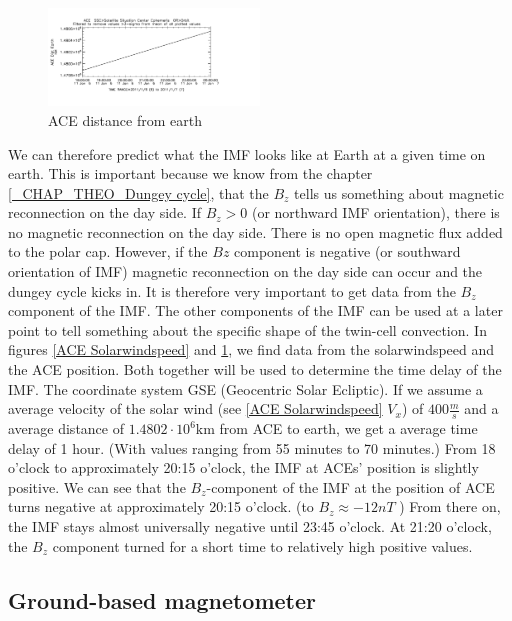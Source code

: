 \documentclass[10pt,a4paper]{article}
\begin{document}
\begin{figure}[h]
\centering
\includegraphics[width=0.5\textwidth]{ACE_distance.pdf}
\caption{ ACE distance from earth \label{ACE distance}}
\end{figure}
We can therefore predict what the IMF looks like at Earth at a given time on earth. This is important because we know from the chapter \ref{_CHAP_THEO_Dungey cycle}, that the $B_z$ 
tells us something about magnetic reconnection on the day side. If $B_z>0$ (or northward IMF orientation), there is no magnetic reconnection on the day side. 
There is no open magnetic flux added to the polar cap. However, if the $Bz$ component is negative (or southward orientation of IMF) magnetic reconnection on the day side 
can occur and the dungey cycle kicks in. It is therefore very important to get data from the $B_z$ component of the IMF. The other components of the IMF can be used at a 
later point to tell something about the specific shape of the twin-cell convection. In figures \ref{ACE Solarwindspeed} and \ref{ACE distance}, we find data from 
the solarwindspeed and the ACE position. Both together will be used to determine the time delay of the IMF. The coordinate system GSE (Geocentric Solar Ecliptic). 
If we assume a average velocity of the solar wind (see \ref{ACE Solarwindspeed} $V_x$) of $400 \frac{m}{s}$ and a average distance of $1.4802 \cdot 10^{6} \mathrm{km}$ 
from ACE to earth, we get a average time delay of 1 hour. (With values ranging from 55 minutes to 70 minutes.) From 18 o'clock to approximately 20:15 o'clock, 
the IMF at ACEs' position is slightly positive. We can see that the $B_z$-component of the IMF at the position of ACE turns negative at approximately 20:15 o'clock. 
(to $B_z\approx-12 n T$ ) From there on, the IMF stays almost universally negative until 23:45 o'clock. At 21:20 o'clock, the $B_z$ component turned for a short time 
to relatively high positive values.   


\subsection{Ground-based magnetometer\label{0_CHAPTER_GROUNDBASEDMag}}
\end{document}

